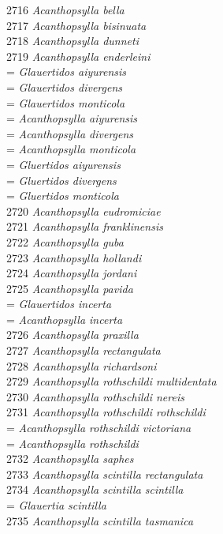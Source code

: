 \documentclass[
]{article}
\begin{document}
2716 \emph{Acanthopsylla bella}\\
2717 \emph{Acanthopsylla bisinuata}\\
2718 \emph{Acanthopsylla dunneti}\\
2719 \emph{Acanthopsylla enderleini}\\
= \emph{Glauertidos aiyurensis}\\
= \emph{Glauertidos divergens}\\
= \emph{Glauertidos monticola}\\
= \emph{Acanthopsylla aiyurensis}\\
= \emph{Acanthopsylla divergens}\\
= \emph{Acanthopsylla monticola}\\
= \emph{Gluertidos aiyurensis}\\
= \emph{Gluertidos divergens}\\
= \emph{Gluertidos monticola}\\
2720 \emph{Acanthopsylla eudromiciae}\\
2721 \emph{Acanthopsylla franklinensis}\\
2722 \emph{Acanthopsylla guba}\\
2723 \emph{Acanthopsylla hollandi}\\
2724 \emph{Acanthopsylla jordani}\\
2725 \emph{Acanthopsylla pavida}\\
= \emph{Glauertidos incerta}\\
= \emph{Acanthopsylla incerta}\\
2726 \emph{Acanthopsylla praxilla}\\
2727 \emph{Acanthopsylla rectangulata}\\
2728 \emph{Acanthopsylla richardsoni}\\
2729 \emph{Acanthopsylla rothschildi multidentata}\\
2730 \emph{Acanthopsylla rothschildi nereis}\\
2731 \emph{Acanthopsylla rothschildi rothschildi}\\
= \emph{Acanthopsylla rothschildi victoriana}\\
= \emph{Acanthopsylla rothschildi}\\
2732 \emph{Acanthopsylla saphes}\\
2733 \emph{Acanthopsylla scintilla rectangulata}\\
2734 \emph{Acanthopsylla scintilla scintilla}\\
= \emph{Glauertia scintilla}\\
2735 \emph{Acanthopsylla scintilla tasmanica}\\
\end{document}

